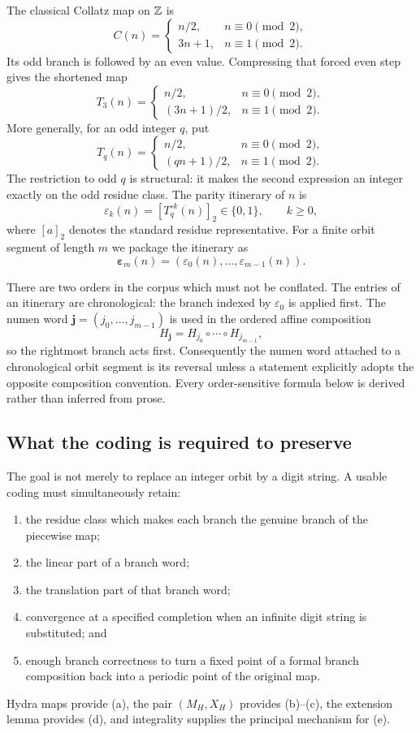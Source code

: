 The classical Collatz map on $\mathbb Z$ is
\[
 C(n)=
 \begin{cases}
 n/2,&n\equiv0\pmod2,\\
 3n+1,&n\equiv1\pmod2.
 \end{cases}
\]
Its odd branch is followed by an even value.  Compressing that forced even
step gives the shortened map
\[
 T_3(n)=
 \begin{cases}
 n/2,&n\equiv0\pmod2,\\
 (3n+1)/2,&n\equiv1\pmod2.
 \end{cases}
\]
More generally, for an odd integer $q$, put
\begin{equation}
\label{eq:Tq}
 T_q(n)=
 \begin{cases}
 n/2,&n\equiv0\pmod2,\\
 (qn+1)/2,&n\equiv1\pmod2.
 \end{cases}
\end{equation}
The restriction to odd $q$ is structural: it makes the second expression an
integer exactly on the odd residue class.  The parity itinerary of $n$ is
\[
 \varepsilon_k(n)=[T_q^{\circ k}(n)]_2\in\{0,1\},\qquad k\geq0,
\]
where $[a]_2$ denotes the standard residue representative.  For a finite
orbit segment of length $m$ we package the itinerary as
\[
 \boldsymbol\varepsilon_m(n)
   =(\varepsilon_0(n),\ldots,\varepsilon_{m-1}(n)).
\]

There are two orders in the corpus which must not be conflated.  The entries
of an itinerary are chronological: the branch indexed by $\varepsilon_0$ is
applied first.  The numen word $\mathbf j=(j_0,\ldots,j_{m-1})$ is used in
the ordered affine composition
\[
 H_{\mathbf j}=H_{j_0}\circ\cdots\circ H_{j_{m-1}},
\]
so the rightmost branch acts first.  Consequently the numen word attached to
a chronological orbit segment is its reversal unless a statement explicitly
adopts the opposite composition convention.  Every order-sensitive formula
below is derived rather than inferred from prose.

\subsection{What the coding is required to preserve}

The goal is not merely to replace an integer orbit by a digit string.  A
usable coding must simultaneously retain:
\begin{enumerate}[label=\textup{(\alph*)}]
\item the residue class which makes each branch the genuine branch of the
      piecewise map;
\item the linear part of a branch word;
\item the translation part of that branch word;
\item convergence at a specified completion when an infinite digit string
      is substituted; and
\item enough branch correctness to turn a fixed point of a formal branch
      composition back into a periodic point of the original map.
\end{enumerate}
Hydra maps provide (a), the pair $(M_H,X_H)$ provides (b)--(c), the extension
lemma provides (d), and integrality supplies the principal mechanism for (e).
